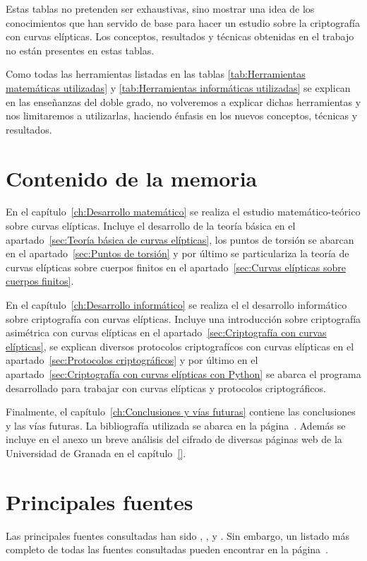 Estas tablas no pretenden ser exhaustivas, sino mostrar una idea de los conocimientos que han servido de base para hacer un estudio sobre la criptografía con curvas elípticas. Los conceptos, resultados y técnicas obtenidas en el trabajo no están presentes en estas tablas.

Como todas las herramientas listadas en las tablas \ref{tab:Herramientas matemáticas utilizadas} y \ref{tab:Herramientas informáticas utilizadas} se explican en las enseñanzas del doble grado, no volveremos a explicar dichas herramientas y nos limitaremos a utilizarlas, haciendo énfasis en los nuevos conceptos, técnicas y resultados.


\section{Contenido de la memoria}
\label{sub:Contenido de la memoria}

En el capítulo~\ref{ch:Desarrollo matemático} se realiza el estudio matemático-teórico sobre curvas elípticas. Incluye el desarrollo de la teoría básica en el apartado~\ref{sec:Teoría básica de curvas elípticas}, los puntos de torsión se abarcan en el apartado~\ref{sec:Puntos de torsión} y por último se particulariza la teoría de curvas elípticas sobre cuerpos finitos en el apartado~\ref{sec:Curvas elípticas sobre cuerpos finitos}.

En el capítulo~\ref{ch:Desarrollo informático} se realiza el el desarrollo informático sobre criptografía con curvas elípticas. Incluye una introducción sobre criptografía asimétrica con curvas elípticas en el apartado~\ref{sec:Criptografía con curvas elípticas}, se explican diversos protocolos criptografícos con curvas elípticas en el apartado~\ref{sec:Protocolos criptográficos} y por último en el apartado~\ref{sec:Criptografía con curvas elípticas con Python} se abarca el programa desarrollado para trabajar con curvas elípticas y protocolos criptográficos.

Finalmente, el capítulo~\ref{ch:Conclusiones y vías futuras} contiene las conclusiones y las vías futuras. La bibliografía utilizada se abarca en la página~\pageref{app:bibliography}. Además se incluye en el anexo un breve análisis del cifrado de diversas páginas web de la Universidad de Granada en el capítulo~\ref{}.


\section{Principales fuentes}
\label{sub:Principales fuentes}

Las principales fuentes consultadas han sido \cite{Washington:2008}, \cite{Hankerson:2003}, \cite{Silverman:2009} y \cite{Menezes:1996}. Sin embargo, un listado más completo de todas las fuentes consultadas pueden encontrar en la página~\pageref{app:bibliography}.

